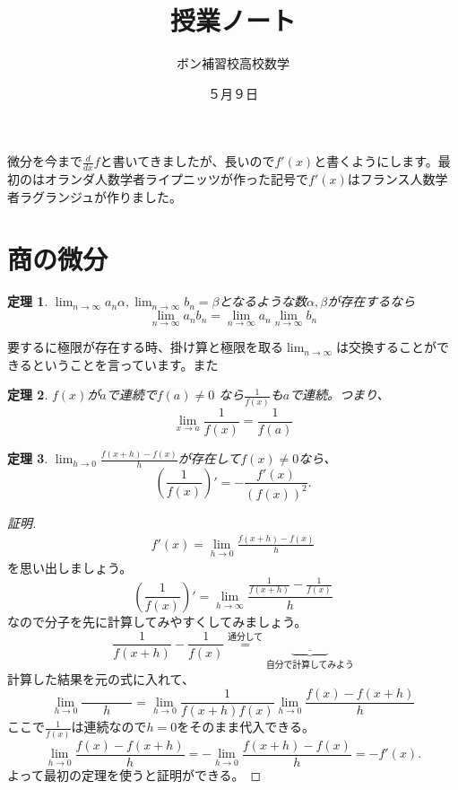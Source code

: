 \documentclass{ltjsarticle}
\title{授業ノート}
\author{ボン補習校高校数学}
\date{５月９日}
\newtheorem{theorem}{定理}[section]
\begin{document}
\maketitle
微分を今まで${\frac d {dx}}f$と書いてきましたが、長いので$f'(x)$と書くようにします。最初のはオランダ人数学者ライプニッツが作った記号で$f'(x)$はフランス人数学者ラグランジュが作りました。
\section{商の微分}

\begin{theorem}
$\lim_{n\to\infty}a_n\alpha,\lim_{n\to\infty}b_n=\beta$となるような数$\alpha,\beta$が存在するなら
\begin{equation*}
\lim_{n\to \infty}a_nb_n = \lim_{n\to\infty}a_n\lim_{n\to\infty} b_n
\end{equation*}
\end{theorem}
要するに極限が存在する時、掛け算と極限を取る$\lim_{n\to\infty}$は交換することができるということを言っています。また
\begin{theorem}
$f(x)$が$a$で連続で$f(a)\not=0$ なら${\frac 1 {f(x)}}$も$a$で連続。つまり、
\begin{equation*}
\lim_{x\to a}{\frac 1 {f(x)}} = {\frac 1 {f(a)}}
\end{equation*}
\end{theorem}
\begin{theorem}
$\lim_{h\to0}{\frac {f(x+h)-f(x)} h}$が存在して$f(x)\not=0$なら、
\begin{equation*}
\left({\frac 1 {f(x)}}\right)' =- {\frac {f'(x)} {(f(x))^2}}.
\end{equation*}
\end{theorem}
\begin{proof}[証明]
\begin{align*}
f'(x) = \lim_{h\to0}{\frac {f(x+h)-f(x)} h}
\end{align*}
を思い出しましょう。
\begin{equation*}
\left({\frac 1 {f(x)}} \right)'= \lim_{h\to\infty}{\frac {{\frac 1 {f(x+h)}}-{\frac 1 {f(x)}}} {h}}
\end{equation*}
なので分子を先に計算してみやすくしてみましょう。
\begin{equation*}
{\frac 1 {f(x+h)}}-{\frac 1 {f(x)}} \stackrel{\text{通分して}}{=}\underbrace{\underline{\quad\quad\quad}}_{\text{自分で計算してみよう}}
\end{equation*}
計算した結果を元の式に入れて、
\begin{equation*}
\lim_{h\to 0}{\frac {\quad\quad\quad\quad} h} = \lim_{h\to0}{\frac 1 {f(x+h)f(x)}}\lim_{h\to 0}{\frac {f(x)-f(x+h)} h}
\end{equation*}
ここで${\frac 1 {f(x)}}$は連続なので$h=0$をそのまま代入できる。
\begin{equation*}
\lim_{h\to 0}{\frac {f(x)-f(x+h)} h} =- \lim_{h\to 0}{\frac {f(x+h)-f(x)} h} = -f'(x).
\end{equation*}
よって最初の定理を使うと証明ができる。
\end{proof}
\end{document}
